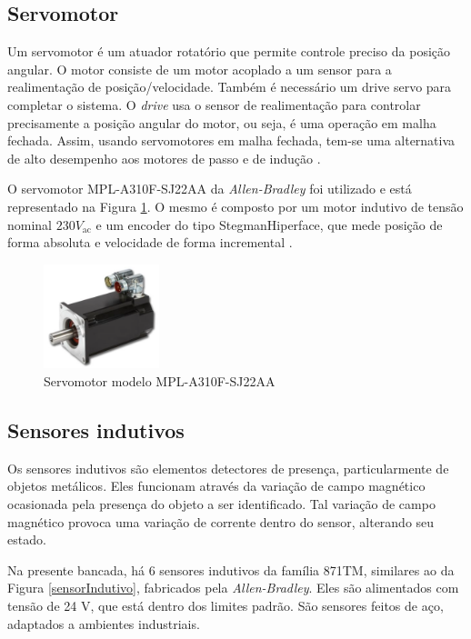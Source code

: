 \subsection{Servomotor}

Um servomotor é um atuador rotatório que permite controle preciso da posição angular. O motor consiste de um motor acoplado a um sensor para a realimentação de posição/velocidade. Também é necessário um drive servo para completar o sistema. O \textit{drive} usa o sensor de realimentação para controlar precisamente a posição angular do motor, ou seja, é uma operação em malha fechada. Assim, usando servomotores em malha fechada, tem-se uma alternativa de alto desempenho aos motores de passo e de indução \cite{defServoMotores}.

O servomotor MPL-A310F-SJ22AA da \textit{Allen-Bradley} foi utilizado e está representado na Figura \ref{servomotor}. O mesmo é composto por um motor indutivo de tensão nominal $230V_{\mathrm{ac}}$ e um encoder do tipo StegmanHiperface, que mede posição de forma absoluta e velocidade de forma incremental \cite{redytton}.

\begin{figure}[!ht]
  \centering
    \includegraphics[width=0.3\textwidth]{figs/fundamentos/servomotor}
    \caption{Servomotor modelo MPL-A310F-SJ22AA\label{servomotor}}
\end{figure}

\subsection{Sensores indutivos}
Os sensores indutivos são elementos detectores de presença, particularmente de objetos metálicos. Eles funcionam através da variação de campo magnético ocasionada pela presença do objeto a ser identificado. Tal variação de campo magnético provoca uma variação de corrente dentro do sensor, alterando seu estado.

Na presente bancada, há 6 sensores indutivos da família 871TM, similares ao da Figura \ref{sensorIndutivo}, fabricados pela \textit{Allen-Bradley}. Eles são alimentados com tensão de 24 V, que está dentro dos limites padrão. São sensores feitos de aço, adaptados a ambientes industriais.


